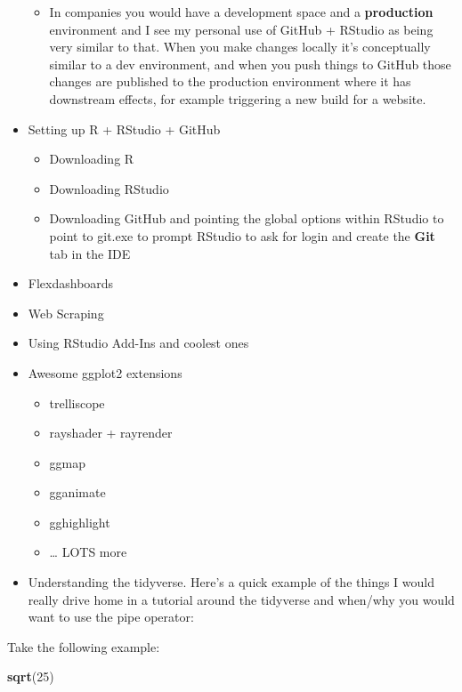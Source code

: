 \documentclass[
]{book}
\newenvironment{Shaded}{\begin{snugshade}}{\end{snugshade}}
\newcommand{\DecValTok}[1]{\textcolor[rgb]{0.00,0.00,0.81}{#1}}
\newcommand{\KeywordTok}[1]{\textcolor[rgb]{0.13,0.29,0.53}{\textbf{#1}}}
\newcommand{\NormalTok}[1]{#1}
\providecommand{\tightlist}{%
  \setlength{\itemsep}{0pt}\setlength{\parskip}{0pt}}
\begin{document}
\begin{itemize}
  \begin{itemize}
  \tightlist
  \item
    In companies you would have a development space and a \textbf{production} environment and I see my personal use of GitHub + RStudio as being very similar to that. When you make changes locally it's conceptually similar to a dev environment, and when you push things to GitHub those changes are published to the production environment where it has downstream effects, for example triggering a new build for a website.
  \end{itemize}
\item
  Setting up R + RStudio + GitHub

  \begin{itemize}
  \item
    Downloading R
  \item
    Downloading RStudio
  \item
    Downloading GitHub and pointing the global options within RStudio to point to git.exe to prompt RStudio to ask for login and create the \textbf{Git} tab in the IDE
  \end{itemize}
\item
  Flexdashboards
\item
  Web Scraping
\item
  Using RStudio Add-Ins and coolest ones
\item
  Awesome ggplot2 extensions

  \begin{itemize}
  \item
    trelliscope
  \item
    rayshader + rayrender
  \item
    ggmap
  \item
    gganimate
  \item
    gghighlight
  \item
    \ldots{} LOTS more
  \end{itemize}
\item
  Understanding the tidyverse. Here's a quick example of the things I would really drive home in a tutorial around the tidyverse and when/why you would want to use the pipe operator:
\end{itemize}

Take the following example:

\begin{Shaded}
\begin{Highlighting}[]
\KeywordTok{sqrt}\NormalTok{(}\DecValTok{25}\NormalTok{)}
\end{Highlighting}
\end{Shaded}
\end{document}
